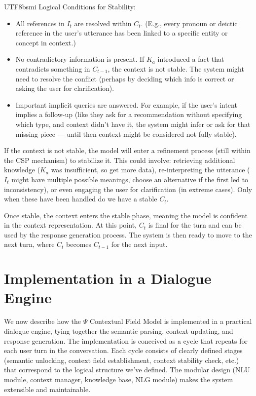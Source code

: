 \documentclass{article}
\begin{document}
\begin{CJK*}{UTF8}{bsmi}
Logical Conditions for Stability:
\begin{itemize}[label=●]
    \item All references in $I_t$ are resolved within $C_t$. (E.g., every pronoun or deictic reference in the user’s utterance has been linked to a specific entity or concept in context.)
    \item No contradictory information is present. If $K_a$ introduced a fact that contradicts something in $C_{t-1}$, the context is not stable. The system might need to resolve the conflict (perhaps by deciding which info is correct or asking the user for clarification).
    \item Important implicit queries are answered. For example, if the user’s intent implies a follow-up (like they ask for a recommendation without specifying which type, and context didn’t have it, the system might infer or ask for that missing piece — until then context might be considered not fully stable).
\end{itemize}

If the context is not stable, the model will enter a refinement process (still within the CSP mechanism) to stabilize it. This could involve: retrieving additional knowledge ($K_a$ was insufficient, so get more data), re-interpreting the utterance ($I_t$ might have multiple possible meanings, choose an alternative if the first led to inconsistency), or even engaging the user for clarification (in extreme cases). Only when these have been handled do we have a stable $C_t$.

Once stable, the context enters the stable phase, meaning the model is confident in the context representation. At this point, $C_t$ is final for the turn and can be used by the response generation process. The system is then ready to move to the next turn, where $C_t$ becomes $C_{t-1}$ for the next input.

\section{Implementation in a Dialogue Engine}
We now describe how the $\Psi$ Contextual Field Model is implemented in a practical dialogue engine, tying together the semantic parsing, context updating, and response generation. The implementation is conceived as a cycle that repeats for each user turn in the conversation. Each cycle consists of clearly defined stages (semantic unlocking, context field establishment, context stability check, etc.) that correspond to the logical structure we’ve defined. The modular design (NLU module, context manager, knowledge base, NLG module) makes the system extensible and maintainable.


\end{CJK*}
\end{document}
